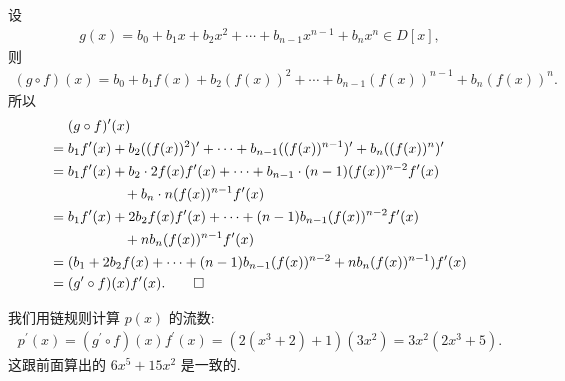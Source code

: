 \begin{pf}
    设
    \begin{align*}
        g(x) = b_0 + b_1 x + b_2 x^2 + \cdots + b_{n-1} x^{n-1} + b_n x^n \in D[x],
    \end{align*}
    则
    \begin{align*}
        (g \circ f) (x) = b_0 + b_1 f(x) + b_2 (f(x))^2 + \cdots + b_{n-1} (f(x))^{n-1} + b_n (f(x))^n.
    \end{align*}
    所以
    \begin{align*}
             & (g \circ f)^{\prime} (x)                                \\
        = {} & b_1 f^{\prime} (x) + b_2 ((f(x))^2)^{\prime} + \cdots
        + b_{n-1} ((f(x))^{n-1})^{\prime} + b_n ((f(x))^n)^{\prime}    \\
        = {} & b_1 f^{\prime} (x) + b_2 \cdot 2 f(x) f^{\prime} (x)
        + \cdots + b_{n-1} \cdot (n-1) (f(x))^{n-2} f^{\prime} (x)     \\
             & \qquad \qquad + b_n \cdot n (f(x))^{n-1} f^{\prime} (x) \\
        = {} & b_1 f^{\prime} (x) + 2b_2 f(x) f^{\prime} (x)
        + \cdots + (n-1) b_{n-1} (f(x))^{n-2} f^{\prime} (x)           \\
             & \qquad \qquad + n b_n (f(x))^{n-1} f^{\prime} (x)       \\
        = {} & (b_1 + 2b_2 f(x) + \cdots + (n-1) b_{n-1} (f(x))^{n-2}
        + n b_n (f(x))^{n-1}) f^{\prime} (x)                           \\
        = {} & (g^{\prime} \circ f) (x) f^{\prime} (x). \qedhere
    \end{align*}
\end{pf}

\begin{example}
    我们用链规则计算 $p(x)$ 的流数:
    \begin{align*}
        p^{\prime} (x) = (g^{\prime} \circ f)(x) f^{\prime} (x) = (2(x^3+2) + 1)(3x^2) = 3x^2(2x^3 + 5).
    \end{align*}
    这跟前面算出的 $6x^5 + 15x^2$ 是一致的.
\end{example}
